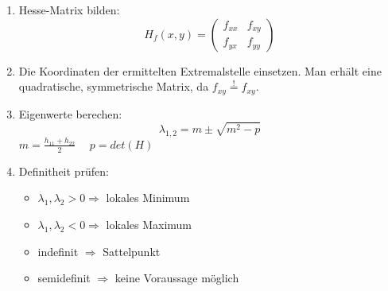 \begin{enumerate}
    \item Hesse-Matrix bilden: 
    $$ 
     H_f(x,y) = \begin{pmatrix} f_{xx} & f_{xy} \\ f_{yx} & f_{yy} \end{pmatrix}
    $$
    \item Die Koordinaten der ermittelten Extremalstelle einsetzen. Man erhält eine quadratische, symmetrische Matrix, da $f_{xy} \overset{!}{=} f_{xy}$. 
    \item Eigenwerte berechen: 
    $$
    \lambda_{1,2} = m \pm \sqrt{m^2 - p} 
    $$
    $ m = \frac{h_{11} + h_{22}}{2} \hspace{15pt} p = det(H) $
    \item Definitheit prüfen: 
    \begin{itemize}
        \item $\lambda_1, \lambda_2 > 0 \Rightarrow$ lokales Minimum
        \item $\lambda_1, \lambda_2 < 0 \Rightarrow $ lokales Maximum
        \item indefinit $\Rightarrow$ Sattelpunkt
        \item semidefinit $\Rightarrow$ keine Voraussage möglich
    \end{itemize}
\end{enumerate}